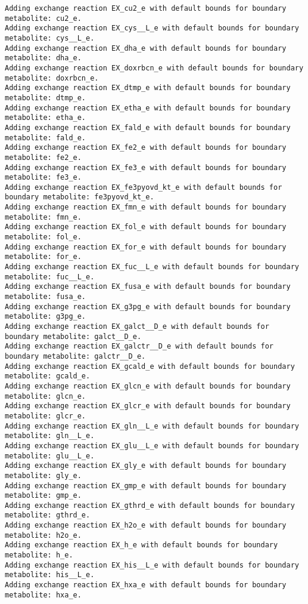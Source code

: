 \documentclass[
  letterpaper,
  DIV=11,
  numbers=noendperiod]{scrartcl}
\begin{document}
\begin{verbatim}
Adding exchange reaction EX_cu2_e with default bounds for boundary metabolite: cu2_e.
Adding exchange reaction EX_cys__L_e with default bounds for boundary metabolite: cys__L_e.
Adding exchange reaction EX_dha_e with default bounds for boundary metabolite: dha_e.
Adding exchange reaction EX_doxrbcn_e with default bounds for boundary metabolite: doxrbcn_e.
Adding exchange reaction EX_dtmp_e with default bounds for boundary metabolite: dtmp_e.
Adding exchange reaction EX_etha_e with default bounds for boundary metabolite: etha_e.
Adding exchange reaction EX_fald_e with default bounds for boundary metabolite: fald_e.
Adding exchange reaction EX_fe2_e with default bounds for boundary metabolite: fe2_e.
Adding exchange reaction EX_fe3_e with default bounds for boundary metabolite: fe3_e.
Adding exchange reaction EX_fe3pyovd_kt_e with default bounds for boundary metabolite: fe3pyovd_kt_e.
Adding exchange reaction EX_fmn_e with default bounds for boundary metabolite: fmn_e.
Adding exchange reaction EX_fol_e with default bounds for boundary metabolite: fol_e.
Adding exchange reaction EX_for_e with default bounds for boundary metabolite: for_e.
Adding exchange reaction EX_fuc__L_e with default bounds for boundary metabolite: fuc__L_e.
Adding exchange reaction EX_fusa_e with default bounds for boundary metabolite: fusa_e.
Adding exchange reaction EX_g3pg_e with default bounds for boundary metabolite: g3pg_e.
Adding exchange reaction EX_galct__D_e with default bounds for boundary metabolite: galct__D_e.
Adding exchange reaction EX_galctr__D_e with default bounds for boundary metabolite: galctr__D_e.
Adding exchange reaction EX_gcald_e with default bounds for boundary metabolite: gcald_e.
Adding exchange reaction EX_glcn_e with default bounds for boundary metabolite: glcn_e.
Adding exchange reaction EX_glcr_e with default bounds for boundary metabolite: glcr_e.
Adding exchange reaction EX_gln__L_e with default bounds for boundary metabolite: gln__L_e.
Adding exchange reaction EX_glu__L_e with default bounds for boundary metabolite: glu__L_e.
Adding exchange reaction EX_gly_e with default bounds for boundary metabolite: gly_e.
Adding exchange reaction EX_gmp_e with default bounds for boundary metabolite: gmp_e.
Adding exchange reaction EX_gthrd_e with default bounds for boundary metabolite: gthrd_e.
Adding exchange reaction EX_h2o_e with default bounds for boundary metabolite: h2o_e.
Adding exchange reaction EX_h_e with default bounds for boundary metabolite: h_e.
Adding exchange reaction EX_his__L_e with default bounds for boundary metabolite: his__L_e.
Adding exchange reaction EX_hxa_e with default bounds for boundary metabolite: hxa_e.

\end{verbatim}
\end{document}
